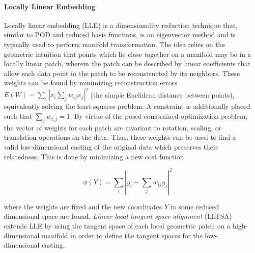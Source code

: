 \paragraph{Locally Linear Embedding} Locally linear embedding (LLE) is a dimensionality reduction technique that, similar to POD and reduced basis functions, is an eigenvector method and is typically used to perform manifold transformation\autocite{saul2000introduction}. The idea relies on the geometric intuition that points which lie close together on a manifold may be in a locally linear patch, wherein the patch can be described by linear coefficients that allow each data point in the patch to be reconstructed by its neighbors. These weights can be found by minimizing reconstruction errors $E(W) = \sum_i | x_i \sum_j w_{ij}x_j|^2$ (the simple Euclidean distance between points), equivalently solving the least squares problem.
A constraint is additionally placed such that $\sum_j w_{i,j} = 1$. By virtue of the posed constrained optimization problem, the vector of weights for each patch are invariant to rotation, scaling, or translation operations on the data. Thus, these weights can be used to find a valid low-dimensional casting of the original data which preserves their relatedness. This is done by minimizing a new cost function 

\begin{equation}
\phi(Y) = \sum_i|y_i - \sum_j w_{ij}y_j|^2
\end{equation}

\noindent where the weights are fixed and the new coordinates $Y$ in some reduced dimensional space are found. \emph{Linear local tangent space alignment} (LLTSA) extends LLE by using the tangent space of each local geometric patch on a high-dimensional manifold in order to define the tangent spaces for the low-dimensional casting\autocite{zhang2007linear}.

